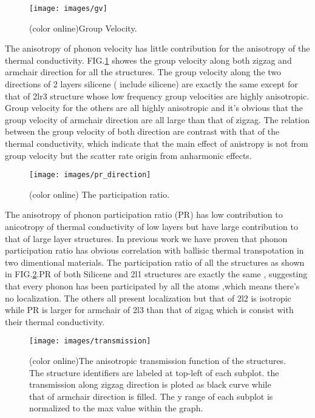 \documentclass[%
 reprint,
 amsmath,amssymb,
 aps,
 prb,
]{revtex4-1}
\begin{document}
\begin{figure}[b]
  \texttt{[image: images/gv]}
  \caption{\label{fig:gv} (color online)Group Velocity.}
\end{figure}

The anisotropy of phonon velocity has little contribution for the anisotropy of the thermal conductivity. FIG.\ref{fig:gv} showes the group velocity along both zigzag and armchair direction for all the structures. The group velocity  along the two directions of  2 layers silicene ( include silicene) are exactly the same except for that of 2lr3 structure whose low frequency group velocities are highly anisotropic. Group velocity for the others are all highly anisotropic and it's obvious that the group velocity of armchair direction are all large than that of zigzag. The relation between the group velocity of both direction are contrast with that of the thermal conductivity, which indicate that the main effect of anistropy is not from group velocity but the scatter rate origin from anharmonic effects.

\begin{figure}[b]
  \texttt{[image: images/pr\_direction]}
  \caption{\label{fig:pr_direction} (color online) The participation ratio.}
\end{figure}

The anisotropy of phonon participation ratio (PR) \cite{Allen1999} has low contribution to anicotropy of thermal conductivity of low layers but have large contribution to that of large layer structures. In previous work we have proven that  phonon participation ratio has obvious correlation with ballisic thermal transpotation in two dimentional materials\cite{Zhou2016}. The participation ratio of all the structures as shown in FIG.\ref{fig:pr_direction}.PR of both Silicene and 2l1 structures are exactly the same , suggesting that every phonon has been participated by all the atoms ,which means there's no localization. The others all present localization but that of 2l2 is isotropic while  PR is larger for armchair of 2l3 than that of zigag which is consist with their thermal conductivity.

\begin{figure}[b]
  \texttt{[image: images/transmission]}
  \caption{\label{fig:transmission} (color online)The anisotropic transmission function of the structures. The structure identifiers are labeled at top-left of each subplot. the transmission along zigzag direction is ploted as black curve while that of armchair direction is filled. The y range of each subplot is normalized to the max value within the graph.}
\end{figure}
\end{document}
